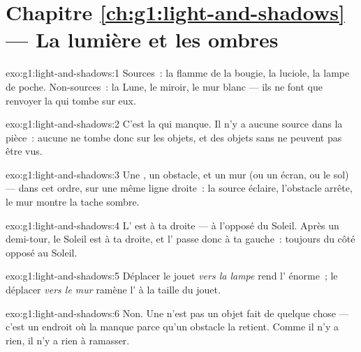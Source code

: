 \section*{Chapitre \ref{ch:g1:light-and-shadows} --- La lumière et les ombres}

\begin{solution}{exo:g1:light-and-shadows:1}
Sources~: la flamme de la bougie, la luciole, la lampe de poche.
Non-sources~: la Lune, le miroir, le mur blanc --- ils ne font que
renvoyer la  qui tombe sur eux.
\end{solution}

\begin{solution}{exo:g1:light-and-shadows:2}
C'est la  qui manque. Il n'y a aucune source dans la pièce~:
aucune  ne tombe donc sur les objets, et des objets sans
 ne peuvent pas être vus.
\end{solution}

\begin{solution}{exo:g1:light-and-shadows:3}
Une , un obstacle, et un mur (ou un écran, ou le
sol) --- dans cet ordre, sur une même ligne droite~: la source
éclaire, l'obstacle arrête, le mur montre la tache sombre.
\end{solution}

\begin{solution}{exo:g1:light-and-shadows:4}
L' est à ta droite --- à l'opposé du Soleil. Après un
demi-tour, le Soleil est à ta droite, et l' passe donc à ta
gauche~: toujours du côté opposé au Soleil.
\end{solution}

\begin{solution}{exo:g1:light-and-shadows:5}
Déplacer le jouet \emph{vers la lampe} rend l' énorme~; le
déplacer \emph{vers le mur} ramène l' à la taille du jouet.
\end{solution}

\begin{solution}{exo:g1:light-and-shadows:6}
Non. Une  n'est pas un objet fait de quelque chose --- c'est un
endroit où la  manque parce qu'un obstacle la retient. Comme
il n'y a rien, il n'y a rien à ramasser.
\end{solution}

